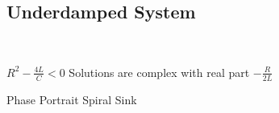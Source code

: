 \documentclass[preview]{standalone}
\begin{document}
\begin{center}
\subsection*{Underdamped System}\\
                    \begin{itomize}
                        \item $R^2 - \frac{4L}{C} < 0$ \rightarrow Solutions are complex with real part $-\frac{R}{2L}$
                        \item Phase Portrait \rightarrow Spiral Sink
                        \item 
                    \end{itomize}
\end{center}
\end{document}
